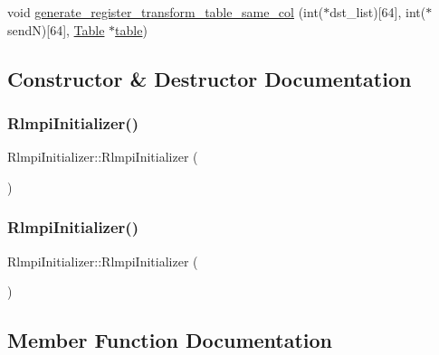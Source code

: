 \begin{DoxyCompactItemize}
\item 
void \mbox{\hyperlink{classRlmpiInitializer_ac67b230ec20837a9ead28023dcfe7332}{generate\+\_\+register\+\_\+transform\+\_\+table\+\_\+same\+\_\+col}} (int($\ast$dst\+\_\+list)\mbox{[}64\mbox{]}, int($\ast$sendN)\mbox{[}64\mbox{]}, \mbox{\hyperlink{structTable}{Table}} $\ast$\mbox{\hyperlink{classRlmpiInitializer_a23796d30caf16cdf78e08ebe5a708588}{table}})
\end{DoxyCompactItemize}


\subsection{Constructor \& Destructor Documentation}
\mbox{\label{classRlmpiInitializer_a658d6a4ceeadcc2101eea81790fe02a9}} 
\subsubsection{\texorpdfstring{RlmpiInitializer()}{RlmpiInitializer()}\hspace{0.1cm}{\footnotesize\ttfamily [1/2]}}
{\footnotesize\ttfamily Rlmpi\+Initializer\+::\+Rlmpi\+Initializer (\begin{DoxyParamCaption}{ }\end{DoxyParamCaption})}

\mbox{\label{classRlmpiInitializer_a658d6a4ceeadcc2101eea81790fe02a9}} 
\subsubsection{\texorpdfstring{RlmpiInitializer()}{RlmpiInitializer()}\hspace{0.1cm}{\footnotesize\ttfamily [2/2]}}
{\footnotesize\ttfamily Rlmpi\+Initializer\+::\+Rlmpi\+Initializer (\begin{DoxyParamCaption}{ }\end{DoxyParamCaption})}



\subsection{Member Function Documentation}
\mbox{\label{classRlmpiInitializer_a03d8fdd916121bf1e703408abaf00492}} 
